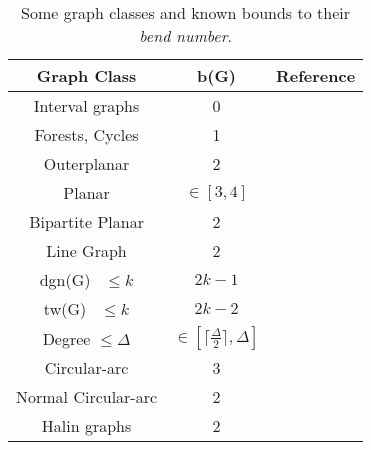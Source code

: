 \begin{table}[h]
\caption{Some graph classes and  known bounds to their \textit{bend number}.}
\label{tab:limitesBenNumber}
\begin{center}
\begin{tabular}{|c|c|c|}
\rowcolor{gray!50}
\hline 
Graph Class & b(G) & Reference \\ 
\hline \hline  
Interval graphs & 0 & \cite{golumbic2009} \\ 
\hline 
Forests, Cycles & 1 & \cite{golumbic2013} \\ 
\hline 
Outerplanar &  2 & \cite{daniel2014b} \\ 
\hline 
Planar & $\in [3, 4]$ & \cite{daniel2014b}\\ 
\hline  
  Bipartite Planar & 2 & \cite{biedl2010} \\ 
\hline 
Line Graph & 2 & \cite{biedl2010} \\ 
\hline 
dgn(G)~\footnotemark %
$\leq k$ & $2k-1$ & \cite{daniel2014b} \\ 
\hline 
tw(G)~\footnotemark%
$\leq k$ & $2k-2$ & \cite{daniel2014b} \\ 
\hline 
Degree $\leq \Delta$ & $ \in [	\lceil \frac{\Delta}{2}\rceil, \Delta ] $ & \cite{daniel2014b} \\ 
\hline 
Circular-arc & 3 & \cite{alcon2016} \\ 
\hline 
Normal Circular-arc & 2 & \cite{alcon2016} \\ 
\hline 
Halin graphs & 2 & \cite{mathew2016}  \\ 
\hline 
\end{tabular} 
\end{center}
\end{table}

